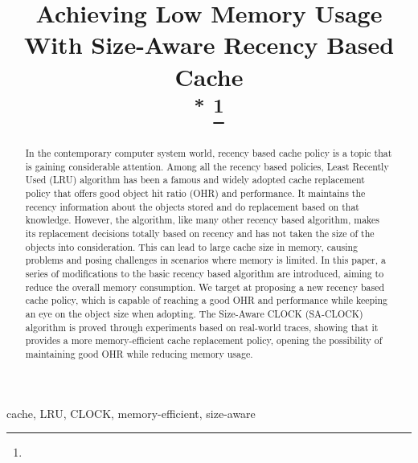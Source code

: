 \documentclass[journal,10.5pt,onecolumn]{IEEEtran}
\begin{document}
\title{Achieving Low Memory Usage With Size-Aware Recency Based Cache\\
{\footnotesize \textsuperscript{*}}
\thanks{}
}

\author{
}

\maketitle

\begin{abstract}
	In the contemporary computer system world, recency based cache policy is a topic that is gaining considerable attention. Among all the recency based policies, Least Recently Used (LRU) algorithm has been a famous and widely adopted cache replacement policy that offers good object hit ratio (OHR) and performance. It maintains the recency information about the objects stored and do replacement based on that knowledge. However, the algorithm, like many other recency based algorithm, makes its replacement decisions totally based on recency and has not taken the size of the objects into consideration. This can lead to large cache size in memory, causing problems and posing challenges in scenarios where memory is limited. In this paper, a series of modifications to the basic recency based algorithm are introduced, aiming to reduce the overall memory consumption. We target at proposing a new recency based cache policy, which is capable of reaching a good OHR and performance while keeping an eye on the object size when adopting. The Size-Aware CLOCK (SA-CLOCK) algorithm is proved through experiments based on real-world traces, showing that it provides a more memory-efficient cache replacement policy, opening the possibility of maintaining good OHR while reducing memory usage.
\end{abstract}

\begin{IEEEkeywords}
	cache, LRU, CLOCK, memory-efficient, size-aware
\end{IEEEkeywords}
\end{document}
